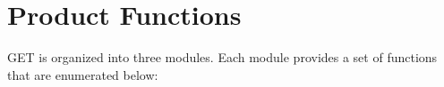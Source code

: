 \documentclass{scrreprt}
\begin{document}

\section{Product Functions}
GET is organized into three modules. Each module provides a set of functions that are enumerated below:
\end{document}
